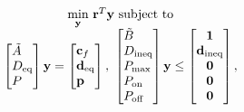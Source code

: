 \begin{equation}
	\begin{matrix*}[c]
		\underset{\mathbf{y}}{\scalebox{1}{\text{min}}} \ \mathbf{r}^T\mathbf{y} \ \text{subject to}\\
		\begin{bmatrix*}[l]
				\tilde{A} \\
				D_{\text{eq}} \\
				P
				\end{bmatrix*} \mathbf{y} = \begin{bmatrix*}[l]\mathbf{c}_f \\ \mathbf{d}_{\text{eq}}\\\mathbf{p} \end{bmatrix*}, \ \begin{bmatrix*}[l]
			\tilde{B} \\
			D_{\text{ineq}} \\ 
			P_{\text{max}} \\
			P_{\text{on}} \\
			P_{\text{off}}
			\end{bmatrix*}\mathbf{y} \le \begin{bmatrix*}\mathbf{1} \\ \mathbf{d}_{\text{ineq}} \\ \mathbf{0} \\ \mathbf{0} \\ \mathbf{0} \end{bmatrix*},
	\end{matrix*}
\end{equation}


